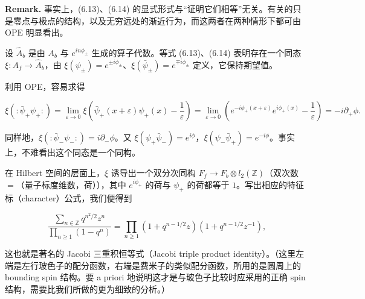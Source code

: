 \textbf{Remark.} 事实上，(6.13)、(6.14) 的显式形式与“证明它们相等”无关。有关的只是零点与极点的结构，以及无穷远处的渐近行为，而这两者在两种情形下都可由 OPE 明显看出。

设 $\widehat{A}_b$ 是由 $A_b$ 与 $e^{in\phi_\pm}$ 生成的算子代数。等式 (6.13)、(6.14) 表明存在一个同态 $\xi:A_f\to\widehat{A}_b$，由 $\xi(\psi_\pm)=e^{\pm i\phi_\pm}$、$\xi(\bar\psi_\pm)=e^{\mp i\phi_\pm}$ 定义，它保持期望值。

利用 OPE，容易求得

\begin{equation}
  \tag{6.15}
  \label{eq:6-15}
  \xi(:\bar\psi_+\psi_+ :)=\lim_{\varepsilon\to0}\xi\left(\bar\psi_+(x+\varepsilon)\psi_+(x)-\frac{1}{\varepsilon}\right)=\lim_{\varepsilon\to0}\left(e^{-i\phi_+(x+\varepsilon)}e^{i\phi_+(x)}-\frac{1}{\varepsilon}\right)=-i\partial_+\phi.
\end{equation}


同样地，$\xi(:\bar\psi_-\psi_- :)=i\partial_-\phi$。又 $\xi(\psi_+\bar\psi_-)=e^{i\phi}$，$\xi(\psi_-\bar\psi_+)=e^{-i\phi}$。事实上，不难看出这个同态是一个同构。

在 Hilbert 空间的层面上，$\xi$ 诱导出一个双分次同构 $F_f\to F_b\otimes l_2(\mathbb{Z})$（双次数 $=$（量子标度维数，荷）），其中 $e^{i\phi_+}$ 的荷与 $\psi_+$ 的荷都等于 $1$。写出相应的特征标（character）公式，我们便得到

\begin{equation}
  \tag{6.16}
  \label{eq:6-16}
  \frac{\sum_{n\in\mathbb{Z}}q^{n^2/2}z^n}{\prod_{n\ge1}(1-q^n)}=\prod_{n\ge1}\left(1+q^{n-1/2}z\right)\left(1+q^{n-1/2}z^{-1}\right),
\end{equation}

这也就是著名的 Jacobi 三重积恒等式（Jacobi triple product identity）。（这里左端是左行玻色子的配分函数，右端是费米子的类似配分函数，所用的是圆周上的 bounding spin 结构。要 a priori 地说明这才是与玻色子比较时应采用的正确 spin 结构，需要比我们所做的更为细致的分析。）

